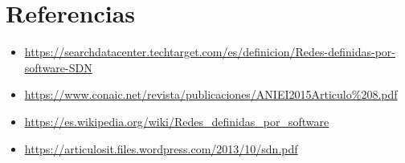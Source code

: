 \documentclass[12pt]{report}
\begin{document}
\section*{Referencias}
\begin{itemize}
  \item \url{https://searchdatacenter.techtarget.com/es/definicion/Redes-definidas-por-software-SDN}
  \item \url{https://www.conaic.net/revista/publicaciones/ANIEI2015Articulo%208.pdf}
  \item \url{https://es.wikipedia.org/wiki/Redes_definidas_por_software}
  \item \url{https://articulosit.files.wordpress.com/2013/10/sdn.pdf}
\end{itemize}
\end{document}
